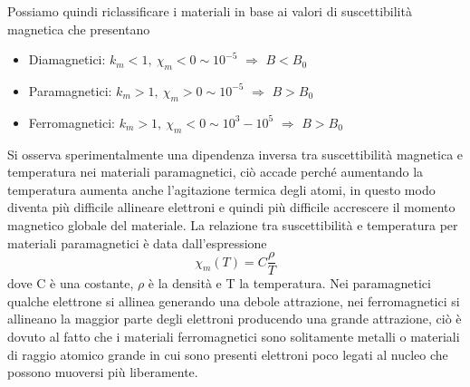\documentclass[10pt,a4paper]{article}
\begin{document}
Possiamo quindi riclassificare i materiali in base ai valori di suscettibilità magnetica che presentano
\begin{itemize}
	\item Diamagnetici: \(k_m <1,\ \chi_m < 0\sim 10^{-5}\) \(\Rightarrow\) \(B< B_0\)
	\item Paramagnetici: \(k_m >1,\ \chi_m > 0\sim 10^{-5}\) \(\Rightarrow\) \(B > B_0\)
	\item Ferromagnetici: \(k_m >1,\ \chi_m < 0\sim 10^{3}-10^{5}\) \(\Rightarrow\) \(B > B_0\)
\end{itemize}
Si osserva sperimentalmente una dipendenza inversa tra suscettibilità magnetica e temperatura nei materiali paramagnetici, ciò accade perché aumentando la temperatura aumenta anche l'agitazione termica degli atomi, in questo modo diventa più difficile allineare elettroni e quindi più difficile accrescere il momento magnetico globale del materiale.
La relazione tra suscettibilità e temperatura per materiali paramagnetici è data dall'espressione
\[\chi_m (T) = C \frac{\rho}{T}\]
dove C è una costante, $\rho$ è la densità e T la temperatura. Nei paramagnetici qualche elettrone si allinea generando una debole attrazione, nei ferromagnetici si allineano la maggior parte degli elettroni producendo una grande attrazione, ciò è dovuto al fatto che i materiali ferromagnetici sono solitamente metalli o materiali di raggio atomico grande in cui sono presenti elettroni poco legati al nucleo che possono muoversi più liberamente. 
\end{document}
